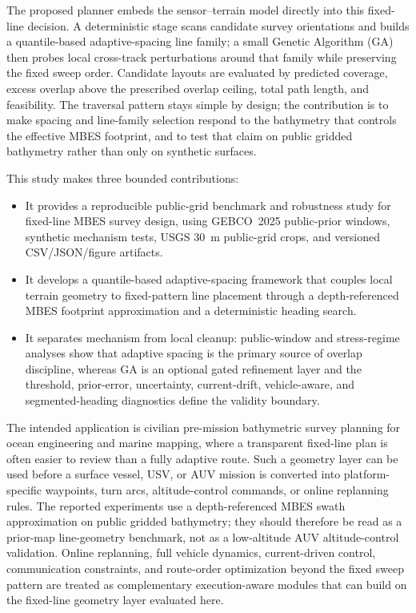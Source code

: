 \documentclass[jmse,article,submit,moreauthors]{Definitions/mdpi}
\begin{document}
The proposed planner embeds the sensor--terrain model directly into this fixed-line decision. A deterministic stage scans candidate survey orientations and builds a quantile-based adaptive-spacing line family; a small Genetic Algorithm (GA) then probes local cross-track perturbations around that family while preserving the fixed sweep order. Candidate layouts are evaluated by predicted coverage, excess overlap above the prescribed overlap ceiling, total path length, and feasibility. The traversal pattern stays simple by design; the contribution is to make spacing and line-family selection respond to the bathymetry that controls the effective MBES footprint, and to test that claim on public gridded bathymetry rather than only on synthetic surfaces.

This study makes three bounded contributions:
\begin{itemize}
    \item It provides a reproducible public-grid benchmark and robustness study for fixed-line MBES survey design, using GEBCO~2025 public-prior windows, synthetic mechanism tests, USGS 30~m public-grid crops, and versioned CSV/JSON/figure artifacts.
    \item It develops a quantile-based adaptive-spacing framework that couples local terrain geometry to fixed-pattern line placement through a depth-referenced MBES footprint approximation and a deterministic heading search.
    \item It separates mechanism from local cleanup: public-window and stress-regime analyses show that adaptive spacing is the primary source of overlap discipline, whereas GA is an optional gated refinement layer and the threshold, prior-error, uncertainty, current-drift, vehicle-aware, and segmented-heading diagnostics define the validity boundary.
\end{itemize}

The intended application is civilian pre-mission bathymetric survey planning for ocean engineering and marine mapping, where a transparent fixed-line plan is often easier to review than a fully adaptive route. Such a geometry layer can be used before a surface vessel, USV, or AUV mission is converted into platform-specific waypoints, turn arcs, altitude-control commands, or online replanning rules. The reported experiments use a depth-referenced MBES swath approximation on public gridded bathymetry; they should therefore be read as a prior-map line-geometry benchmark, not as a low-altitude AUV altitude-control validation. Online replanning, full vehicle dynamics, current-driven control, communication constraints, and route-order optimization beyond the fixed sweep pattern are treated as complementary execution-aware modules that can build on the fixed-line geometry layer evaluated here.
\end{document}

